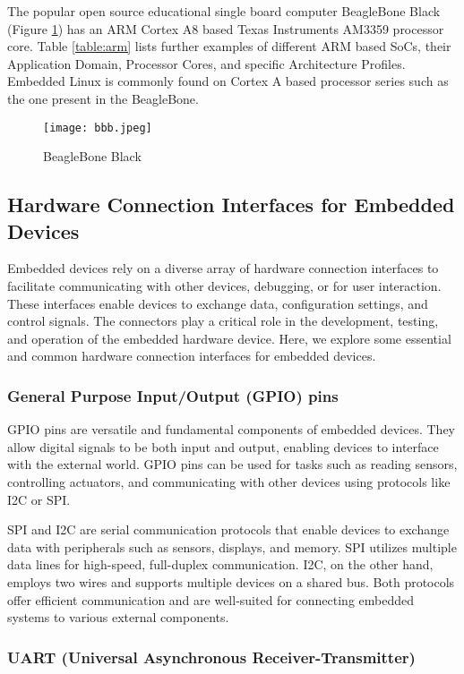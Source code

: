 The popular open source educational single board computer BeagleBone Black (Figure \ref{fig:bbb}) has an ARM Cortex A8 based Texas Instruments AM3359 processor core. Table \ref{table:arm} lists further examples of different ARM based SoCs, their Application Domain, Processor Cores, and specific Architecture Profiles. Embedded Linux is commonly found on Cortex A based processor series such as the one present in the BeagleBone.

\begin{figure}[h]
	\centering
	\texttt{[image: bbb.jpeg]}
	\caption{BeagleBone Black}
	\label{fig:bbb}
\end{figure}

\subsection{Hardware Connection Interfaces for Embedded Devices}

Embedded devices rely on a diverse array of hardware connection interfaces to facilitate communicating with other devices, debugging, or for user interaction. These interfaces enable devices to exchange data, configuration settings, and control signals. The connectors play a critical role in the development, testing, and operation of the embedded hardware device. Here, we explore some essential and common hardware connection interfaces for embedded devices.

\subsubsection{General Purpose Input/Output (GPIO) pins}

GPIO pins are versatile and fundamental components of embedded devices. They allow digital signals to be both input and output, enabling devices to interface with the external world. GPIO pins can be used for tasks such as reading sensors, controlling actuators, and communicating with other devices using protocols like I2C or SPI.

SPI and I2C are serial communication protocols that enable devices to exchange data with peripherals such as sensors, displays, and memory. SPI utilizes multiple data lines for high-speed, full-duplex communication. I2C, on the other hand, employs two wires and supports multiple devices on a shared bus. Both protocols offer efficient communication and are well-suited for connecting embedded systems to various external components.

\subsubsection{UART (Universal Asynchronous Receiver-Transmitter)}

